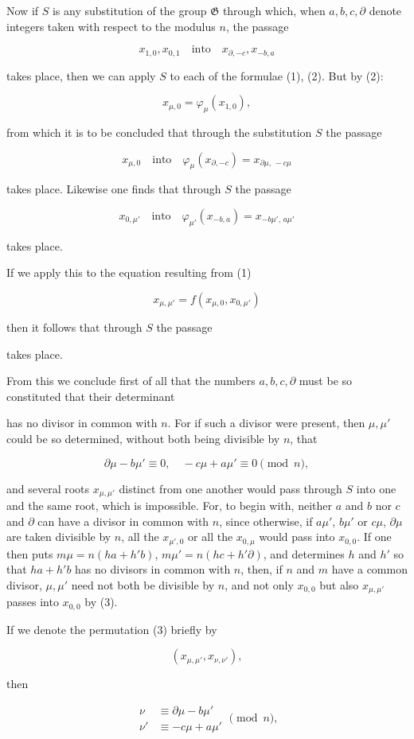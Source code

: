 Now if $S$ is any substitution of the group $\mathfrak{G}$ through which, when $a, b, c, \partial$ denote integers taken with respect to the modulus $n$, the passage

\[
x_{1,0}, x_{0,1} \quad \text{into} \quad x_{\partial,-c}, x_{-b,a}
\]

takes place, then we can apply $S$ to each of the formulae (1), (2). But by (2):

\[
x_{\mu,0} = \varphi_\mu(x_{1,0}),
\]

from which it is to be concluded that through the substitution $S$ the passage

\[
x_{\mu,0} \quad \text{into} \quad \varphi_\mu(x_{\partial,-c}) = x_{\partial\mu,\,-c\mu}
\]

takes place. Likewise one finds that through $S$ the passage

\[
x_{0,\mu'} \quad \text{into} \quad \varphi_{\mu'}(x_{-b,a}) = x_{-b\mu',\,a\mu'}
\]

takes place.

If we apply this to the equation resulting from (1)

\[
x_{\mu,\mu'} = f(x_{\mu,0}, x_{0,\mu'})
\]

then it follows that through $S$ the passage


takes place.

From this we conclude first of all that the numbers $a, b, c, \partial$ must be so constituted that their determinant


has no divisor in common with $n$. For if such a divisor were present, then $\mu, \mu'$ could be so determined, without both being divisible by $n$, that

\[
\partial\mu - b\mu' \equiv 0, \quad -c\mu + a\mu' \equiv 0 \pmod{n},
\]

and several roots $x_{\mu,\mu'}$ distinct from one another would pass through $S$ into one and the same root, which is impossible. For, to begin with, neither $a$ and $b$ nor $c$ and $\partial$ can have a divisor in common with $n$, since otherwise, if $a\mu'$, $b\mu'$ or $c\mu$, $\partial\mu$ are taken divisible by $n$, all the $x_{\mu',0}$ or all the $x_{0,\mu}$ would pass into $x_{0,0}$. If one then puts $m\mu = n(ha + h'b)$, $m\mu' = n(hc + h'\partial)$, and determines $h$ and $h'$ so that $ha + h'b$ has no divisors in common with $n$, then, if $n$ and $m$ have a common divisor, $\mu, \mu'$ need not both be divisible by $n$, and not only $x_{0,0}$ but also $x_{\mu,\mu'}$ passes into $x_{0,0}$ by (3).

If we denote the permutation (3) briefly by

\[
(x_{\mu,\mu'}, x_{\nu,\nu'}),
\]

then

\[
\begin{aligned}
\nu &\equiv \partial\mu - b\mu' \\
\nu' &\equiv -c\mu + a\mu'
\end{aligned}
\pmod{n},
\]

